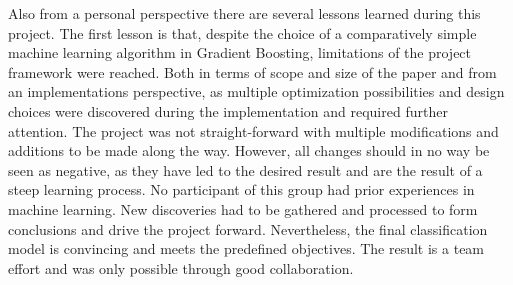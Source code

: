 Also from a personal perspective there are several lessons learned during this project. The first lesson is that, despite the choice of a comparatively simple 
machine learning algorithm in Gradient Boosting, limitations of the project framework were reached. Both in terms of scope and size of the paper and from 
an implementations perspective, as multiple optimization possibilities and design choices were discovered during the implementation and required further attention. The project
was not straight-forward with multiple modifications and additions to be made along the way. However, all changes should in no way be seen as negative, 
as they have led to the desired result and are the result of a steep learning process.
No participant of this group had prior experiences in machine learning. New discoveries had to be gathered and processed to 
form conclusions and drive the project forward.
Nevertheless, the final classification model is convincing and meets the predefined objectives. The result is a team effort and was only possible through 
good collaboration. 




